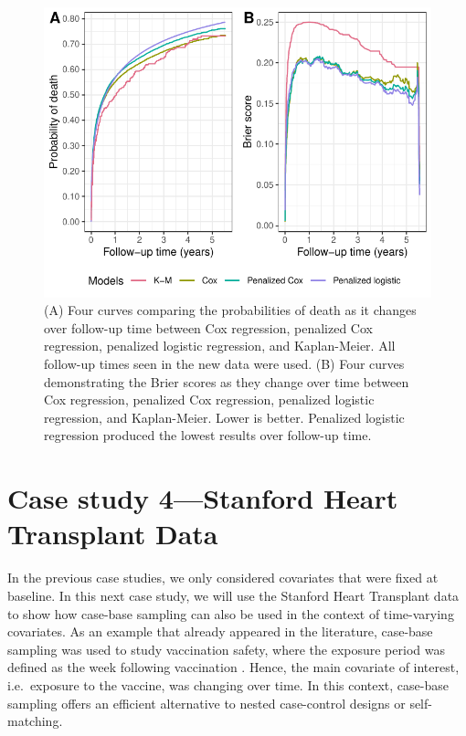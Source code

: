 \documentclass[
]{jss}
\begin{document}
\begin{CodeChunk}
\begin{figure}

{\centering \includegraphics[width=\textwidth,keepaspectratio=true]{../figures/riskregressionBrier-1} 

}

\caption{\label{fig:cs3FinalBrier} (A) Four curves comparing the probabilities of death as it changes over follow-up time between Cox regression, penalized Cox regression, penalized logistic regression, and Kaplan-Meier. All follow-up times seen in the new data were used. (B) Four curves demonstrating the Brier scores as they change over time between Cox regression, penalized Cox regression, penalized logistic regression, and Kaplan-Meier. Lower is better. Penalized logistic regression produced the lowest results over follow-up time.}\label{fig:riskregressionBrier}
\end{figure}
\end{CodeChunk}

\hypertarget{case-study-4stanford-heart-transplant-data}{%
\section{Case study 4---Stanford Heart Transplant
Data}\label{case-study-4stanford-heart-transplant-data}}

In the previous case studies, we only considered covariates that were
fixed at baseline. In this next case study, we will use the Stanford
Heart Transplant data
\citep[\citet{crowley1977covariance}]{clark1971cardiac} to show how
case-base sampling can also be used in the context of time-varying
covariates. As an example that already appeared in the literature,
case-base sampling was used to study vaccination safety, where the
exposure period was defined as the week following vaccination
\citep{saarela2015case}. Hence, the main covariate of interest,
i.e.~exposure to the vaccine, was changing over time. In this context,
case-base sampling offers an efficient alternative to nested
case-control designs or self-matching.
\end{document}
